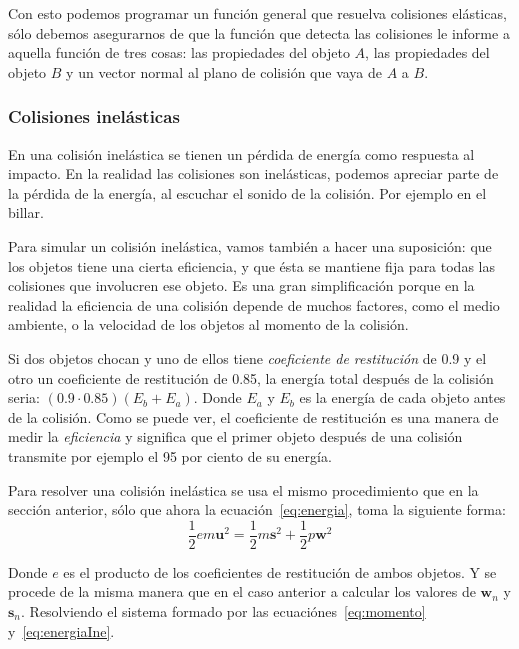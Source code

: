 Con esto podemos programar un función general que resuelva colisiones elásticas, sólo debemos asegurarnos de que la función que detecta las colisiones le informe a aquella función de tres cosas: las propiedades del objeto $A$, las propiedades del objeto $B$ y un vector normal al plano de colisión que vaya de $A$ a $B$.

\subsubsection{Colisiones inelásticas}
En una colisión inelástica se tienen un pérdida de energía como respuesta al impacto.
En la realidad las colisiones son inelásticas, podemos apreciar parte de la pérdida de la energía, al escuchar el sonido de la colisión.
Por ejemplo en el billar.

Para simular un colisión inelástica, vamos también a hacer una suposición: que los objetos tiene una cierta eficiencia, y que ésta se mantiene fija para todas las colisiones que involucren ese objeto.
Es una gran simplificación porque en la realidad la eficiencia de una colisión depende de muchos factores, como el medio ambiente, o la velocidad de los objetos al momento de la colisión.

Si dos objetos chocan y uno de ellos tiene \emph{coeficiente de restitución} de 0.9 y el otro un coeficiente de restitución de 0.85, la energía total después de la colisión seria: $\left( \text{0.9} \cdot \text{0.85} \right) \left(  E_b + E_a \right)$.
Donde $E_a$ y $E_b$ es la energía de cada objeto antes de la colisión.
Como se puede ver, el coeficiente de restitución es una manera de medir la \emph{eficiencia} y significa que el primer objeto después de una colisión transmite por ejemplo el 95 por ciento de su energía.

Para resolver una colisión inelástica se usa el mismo procedimiento que en la sección anterior, sólo que ahora la ecuación~\eqref{eq:energia}, toma la siguiente forma:
\begin{equation}
 \frac{1}{2} e m \textbf{u}^2 = \frac{1}{2} m \textbf{s}^2 + \frac{1}{2} p \textbf{w}^2
 \label{eq:energiaIne} 
\end{equation} 

Donde $e$ es el producto de los coeficientes de restitución de ambos objetos. Y se procede de la misma manera que en el caso anterior a calcular los valores de $\textbf{w}_n$ y $\textbf{s}_n$. Resolviendo el sistema formado por las ecuaciónes~\eqref{eq:momento} y~\eqref{eq:energiaIne}.

